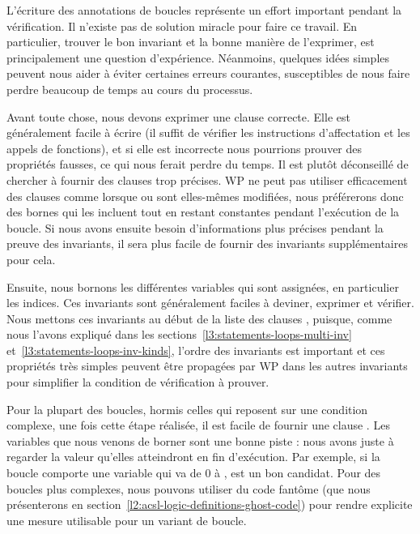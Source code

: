 

L'écriture des annotations de boucles représente un effort important pendant la
vérification. Il n'existe pas de solution miracle pour faire ce travail. En
particulier, trouver le bon invariant et la bonne manière de l'exprimer, est
principalement une question d'expérience. Néanmoins, quelques idées simples
peuvent nous aider à éviter certaines erreurs courantes, susceptibles de nous
faire perdre beaucoup de temps au cours du processus.


Avant toute chose, nous devons exprimer une clause 
correcte. Elle est généralement facile à écrire (il suffit de vérifier les
instructions d'affectation et les appels de fonctions), et si elle est
incorrecte nous pourrions prouver des propriétés fausses, ce qui nous ferait
perdre du temps. Il est plutôt déconseillé de chercher à fournir des clauses
 trop précises. WP ne peut pas utiliser efficacement
des clauses comme  lorsque  ou
 sont elles-mêmes modifiées, nous préférerons donc des bornes qui
les incluent tout en restant constantes pendant l'exécution de la boucle. Si nous
avons ensuite besoin d'informations plus précises pendant la preuve des
invariants, il sera plus facile de fournir des invariants supplémentaires pour
cela.


Ensuite, nous bornons les différentes variables qui sont assignées, en
particulier les indices. Ces invariants sont généralement faciles à deviner,
exprimer et vérifier. Nous mettons ces invariants au début de la liste des
clauses , puisque, comme nous l'avons expliqué
dans les sections~\ref{l3:statements-loops-multi-inv}
et~\ref{l3:statements-loops-inv-kinds}, l'ordre des invariants est important
et ces propriétés très simples peuvent être propagées par WP dans les autres
invariants pour simplifier la condition de vérification à prouver.


Pour la plupart des boucles, hormis celles qui reposent sur une condition
complexe, une fois cette étape réalisée, il est facile de fournir une
clause . Les variables que nous venons de borner sont
une bonne piste : nous avons juste à regarder la valeur qu'elles atteindront
en fin d'exécution. Par exemple, si la boucle comporte une variable
 qui va de 0 à ,  est un bon
candidat. Pour des boucles plus complexes, nous pouvons utiliser du code
fantôme (que nous présenterons en section~\ref{l2:acsl-logic-definitions-ghost-code})
pour rendre explicite une mesure utilisable pour un variant de boucle.


